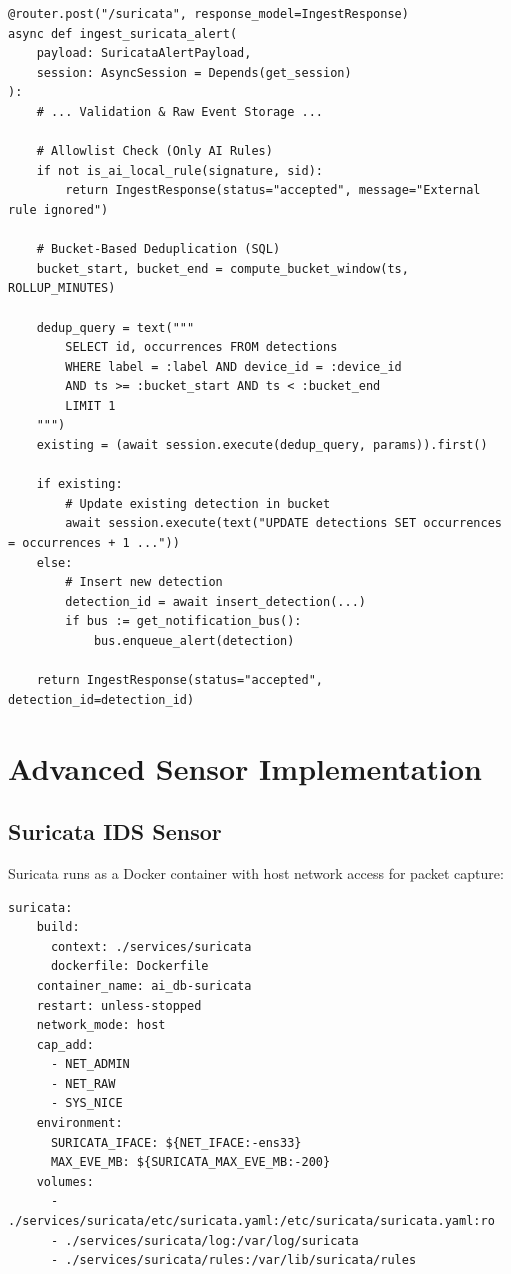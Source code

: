 \documentclass[12pt,a4paper]{report} %
\begin{document}
\begin{lstlisting}[style=python,caption=Suricata Ingestion (suricata\_ingest.py)]
@router.post("/suricata", response_model=IngestResponse)
async def ingest_suricata_alert(
    payload: SuricataAlertPayload,
    session: AsyncSession = Depends(get_session)
):
    # ... Validation & Raw Event Storage ...

    # Allowlist Check (Only AI Rules)
    if not is_ai_local_rule(signature, sid):
        return IngestResponse(status="accepted", message="External rule ignored")

    # Bucket-Based Deduplication (SQL)
    bucket_start, bucket_end = compute_bucket_window(ts, ROLLUP_MINUTES)
    
    dedup_query = text("""
        SELECT id, occurrences FROM detections 
        WHERE label = :label AND device_id = :device_id
        AND ts >= :bucket_start AND ts < :bucket_end
        LIMIT 1
    """)
    existing = (await session.execute(dedup_query, params)).first()

    if existing:
        # Update existing detection in bucket
        await session.execute(text("UPDATE detections SET occurrences = occurrences + 1 ..."))
    else:
        # Insert new detection
        detection_id = await insert_detection(...)
        if bus := get_notification_bus():
            bus.enqueue_alert(detection)

    return IngestResponse(status="accepted", detection_id=detection_id)
\end{lstlisting}

\section{Advanced Sensor Implementation}
\label{sec:sensor-impl}

\subsection{Suricata IDS Sensor}
Suricata runs as a Docker container with host network access for packet capture:

\begin{lstlisting}[style=yaml,caption=Suricata Docker Configuration]
  suricata:
    build:
      context: ./services/suricata
      dockerfile: Dockerfile
    container_name: ai_db-suricata
    restart: unless-stopped
    network_mode: host
    cap_add:
      - NET_ADMIN
      - NET_RAW
      - SYS_NICE
    environment:
      SURICATA_IFACE: ${NET_IFACE:-ens33}
      MAX_EVE_MB: ${SURICATA_MAX_EVE_MB:-200}
    volumes:
      - ./services/suricata/etc/suricata.yaml:/etc/suricata/suricata.yaml:ro
      - ./services/suricata/log:/var/log/suricata
      - ./services/suricata/rules:/var/lib/suricata/rules
\end{lstlisting}
\end{document}
